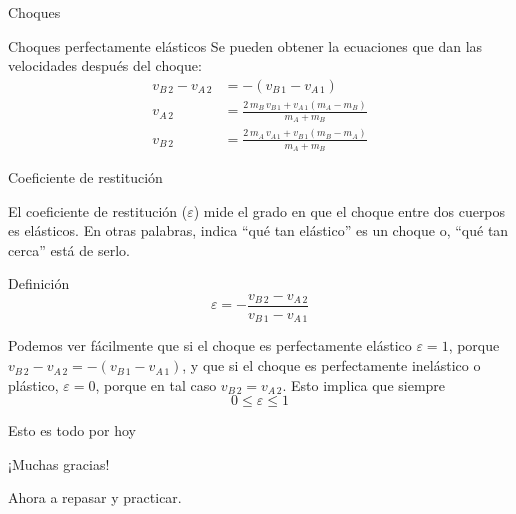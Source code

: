 \documentclass[11pt,handout,aspectratio=1610]{beamer}
\newcommand{\vs}{\vspace{0.3cm}}
\begin{document}
\begin{frame}{Choques}

    \begin{block}{Choques perfectamente elásticos}
        Se pueden obtener la ecuaciones que dan las velocidades después del choque:
        \begin{align*}
            v_{B \, 2} - v_{A \, 2} &= - \left(v_{B\,1} - v_{A \, 1}\right) \\
                         v_{A \, 2} &= \frac{2 \, m_B \, v_{B\,1} + v_{A \, 1} \left(m_A - m_B\right)}{m_A + m_B} \\
                         v_{B \, 2} &= \frac{2 \, m_A \, v_{A\,1} + v_{B \, 1} \left(m_B - m_A\right)}{m_A + m_B}
        \end{align*}
    \end{block}

\end{frame}

\begin{frame}{Coeficiente de restitución}

    El coeficiente de restitución ($\varepsilon$) mide el grado en que el choque entre dos cuerpos es elásticos. En otras palabras, indica ``qué tan elástico'' es un choque o, ``qué tan cerca'' está de serlo.

    \begin{block}{Definición}
        $$\varepsilon = - \frac{v_{B \, 2} - v_{A \, 2}}{v_{B\,1} - v_{A \, 1}}$$
    \end{block}

    Podemos ver fácilmente que si el choque es perfectamente elástico $\varepsilon = 1$, porque $v_{B \, 2} - v_{A \, 2} = - \left(v_{B\,1} - v_{A \, 1}\right)$, y que si el choque es perfectamente inelástico o plástico, $\varepsilon = 0$, porque en tal caso $v_{B \, 2} = v_{A \, 2}$. Esto implica que siempre $$0 \leq \varepsilon \leq 1$$

\end{frame}

\begin{frame}{Esto es todo por hoy}

    \begin{center}
        {\huge ¡Muchas gracias!}

        \vs

        Ahora a repasar y practicar.
    \end{center}

\end{frame}
\end{document}

